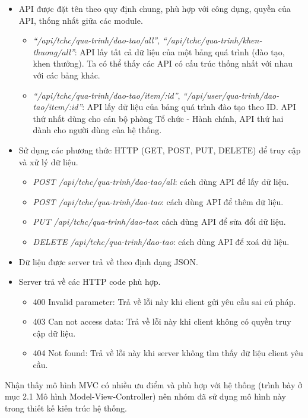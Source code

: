 \begin{itemize}
    \item API được đặt tên theo quy định chung, phù hợp với công dụng, quyền của API, thống nhất giữa các module.
    \begin{itemize}
        \item \textit{``/api/tchc/qua-trinh/dao-tao/all''}, \textit{``/api/tchc/qua-trinh/khen-thuong/all''}: API lấy tất cả dữ liệu của một bảng quá trình (đào tạo, khen thưởng). Ta có thể thấy các API có cấu trúc thống nhất với nhau với các bảng khác.
        \item \textit{``/api/tchc/qua-trinh/dao-tao/item/:id''}, \textit{``/api/user/qua-trinh/dao-tao/item/:id''}: API lấy dữ liệu của bảng quá trình đào tạo theo ID. API thứ nhất dùng cho cán bộ phòng Tổ chức - Hành chính, API thứ hai dành cho người dùng của hệ thống.
    \end{itemize}
    \item Sử dụng các phương thức HTTP (GET, POST, PUT, DELETE) để truy cập và xử lý dữ liệu.
    \begin{itemize}
        \item  \textit{POST /api/tchc/qua-trinh/dao-tao/all}: cách dùng API để lấy dữ liệu.
        \item  \textit{POST /api/tchc/qua-trinh/dao-tao}: cách dùng API để thêm dữ liệu.
        \item  \textit{PUT /api/tchc/qua-trinh/dao-tao}: cách dùng API để sửa đổi dữ liệu.
        \item  \textit{DELETE /api/tchc/qua-trinh/dao-tao}: cách dùng API để xoá dữ liệu.
    \end{itemize}
    \item Dữ liệu được server trả về theo định dạng JSON.
    \item Server trả về các HTTP code phù hợp.
    \begin{itemize}
        \item  400 Invalid parameter: Trả về lỗi này khi client gửi yêu cầu sai cú pháp.
        \item  403 Can not access data: Trả về lỗi này khi client không có quyền truy cập dữ liệu.
        \item  404 Not found: Trả về lỗi này khi server không tìm thấy dữ liệu client yêu cầu.
    \end{itemize}
\end{itemize}

Nhận thấy mô hình MVC có nhiều ưu điểm và phù hợp với hệ thống (trình bày ở mục 2.1 Mô hình Model-View-Controller) nên nhóm đã sử dụng mô hình này trong thiết kế kiến trúc hệ thống.\\

